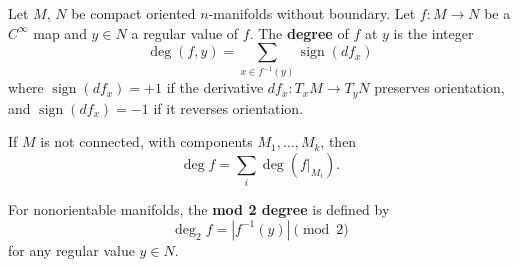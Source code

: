 Let $M$, $N$ be compact oriented $n$-manifolds without boundary. Let $f \colon M \to N$ be a $C^{\infty}$ map and $y \in N$ a regular value of $f$. The \textbf{degree} of $f$ at $y$ is the integer
$$\deg(f, y) = \sum_{x \in f^{-1}(y)} \operatorname{sign}(df_x)$$
where $\operatorname{sign}(df_x) = +1$ if the derivative $df_x \colon T_x M \to T_y N$ preserves orientation, and $\operatorname{sign}(df_x) = -1$ if it reverses orientation.

If $M$ is not connected, with components $M_1, \ldots, M_k$, then
$$\deg f = \sum_{i} \deg(f|_{M_i}).$$

For nonorientable manifolds, the \textbf{mod 2 degree} is defined by
$$\deg_2 f = |f^{-1}(y)| \pmod{2}$$
for any regular value $y \in N$.
